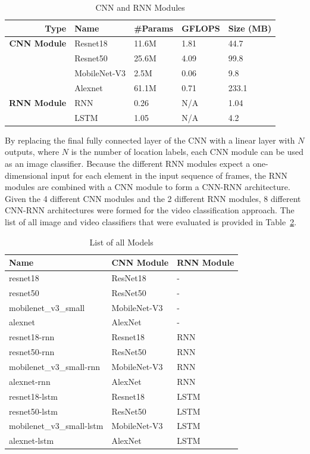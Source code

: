 \documentclass[a4paper]{article}
\begin{document}
  \begin{table}[ht]
    \centering
    \begin{tabular}{rllll}
      \toprule
      Type & Name & \#Params & GFLOPS & Size (MB) \\
      \midrule
      \textbf{CNN Module} & Resnet18~\cite{resnet} & 11.6M & 1.81 & 44.7 \\
                          & Resnet50~\cite{resnet} & 25.6M & 4.09 & 99.8 \\
                          & MobileNet-V3 & 2.5M & 0.06 & 9.8 \\
                          & Alexnet & 61.1M & 0.71 & 233.1 \\
      \midrule
      \textbf{RNN Module} & RNN & 0.26 & N/A & 1.04 \\
                          & LSTM & 1.05 & N/A & 4.2 \\
      \bottomrule
    \end{tabular}
    \caption{CNN and RNN Modules}
    \label{tab:modules}
  \end{table}

  By replacing the final fully connected layer of the CNN with a linear layer
  with $N$ outputs, where $N$ is the number of location labels, each CNN module
  can be used as an image classifier. Because the different RNN modules expect a
  one-dimensional input for each element in the input sequence of frames, the
  RNN modules are combined with a CNN module to form a CNN-RNN architecture.
  Given the 4 different CNN modules and the 2 different RNN modules, 8 different
  CNN-RNN architectures were formed for the video classification approach. The
  list of all image and video classifiers that were evaluated is provided in
  Table~\ref{tab:models}.


  \begin{table}[ht]
    \centering
    \begin{tabular}{lll}
      \toprule
      \bfseries Name & \bfseries CNN Module & \bfseries RNN Module \\
      \midrule
      resnet18 & ResNet18 & - \\
      resnet50 & ResNet50 & - \\
      mobilenet\_v3\_small & MobileNet-V3 & - \\
      alexnet & AlexNet & - \\
      \midrule
      resnet18-rnn & Resnet18 & RNN \\
      resnet50-rnn & ResNet50 & RNN \\
      mobilenet\_v3\_small-rnn & MobileNet-V3 & RNN \\
      alexnet-rnn & AlexNet & RNN \\
      resnet18-lstm & Resnet18 & LSTM \\
      resnet50-lstm & ResNet50 & LSTM \\
      mobilenet\_v3\_small-lstm & MobileNet-V3 & LSTM \\
      alexnet-lstm & AlexNet & LSTM \\
      \bottomrule
    \end{tabular}
    \caption{List of all Models}
    \label{tab:models}
  \end{table}
\end{document}
